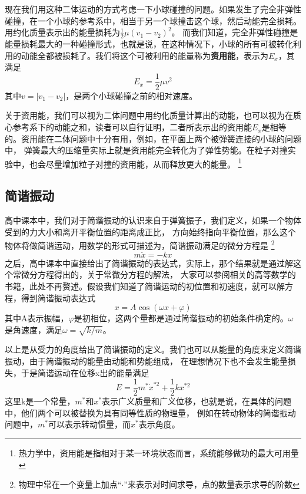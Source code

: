 \documentclass{article}
\begin{document}
    现在我们用这种二体运动的方式考虑一下小球碰撞的问题。如果发生了完全非弹性碰撞，在一个小球的参考系中，相当于另一个球撞击这个球，然后动能完全损耗。用约化质量表示出的能量损耗为\(\frac{1}{2}\mu (v_1 - v_2)^2\)。
    而我们知道，完全非弹性碰撞是能量损耗最大的一种碰撞形式，也就是说，在这种情况下，小球的所有可被转化利用的动能全都被损耗了。我们将这个可被利用的能量称为\textbf{资用能}，表示为\(E_x\)，其满足
    \begin{equation*}
        E_x = \frac{1}{2}\mu v^2
    \end{equation*}
    其中\(v = |v_1 - v_2|\)，是两个小球碰撞之前的相对速度。

    关于资用能，我们可以视为二体问题中用约化质量计算出的动能，也可以视为在质心参考系下的动能之和，读者可以自行证明，二者所表示出的资用能\(E_x\)是相等的。资用能在二体问题中十分有用，例如，在平面上两个被弹簧连接的小球的问题中，
    弹簧最大的压缩量实际上就是资用能完全转化为了弹性势能。在粒子对撞实验中，也会尽量增加粒子对撞的资用能，从而释放更大的能量。
    \footnote{热力学中，资用能是指相对于某一环境状态而言，系统能够做功的最大可用量}


    \subsection{简谐振动}
    高中课本中，我们对于简谐振动的认识来自于弹簧振子，我们定义，如果一个物体受到的力大小和离开平衡位置的距离成正比，
    方向始终指向平衡位置，那么这个物体将做简谐运动，用数学的形式可描述为，简谐振动满足的微分方程是
    \footnote{物理中常在一个变量上加点“\(\cdot\)”来表示对时间求导，点的数量表示求导的阶数}
    \begin{equation*}
        m\ddot{x} = -kx
    \end{equation*}
    之后，高中课本中直接给出了简谐振动的表达式，实际上，那个结果就是通过解这个常微分方程得出的，关于常微分方程的解法，
    大家可以参阅相关的高等数学的书籍，此处不再赘述。假设我们知道了简谐运动的初位置和初速度，就可以解方程，得到简谐振动表达式
    \begin{equation*}
        x = A\cos(\omega x + \varphi)
    \end{equation*}
    其中A表示振幅，\(\varphi\)是初相位，这两个量都是通过简谐振动的初始条件确定的。\(\omega\)是角速度，满足\(\omega = \sqrt{k/m}\)。

    以上是从受力的角度给出了简谐振动的定义。我们也可以从能量的角度来定义简谐振动，由于简谐振动的能量由动能和势能组成，
    在理想情况下也不会发生能量损失，于是简谐运动在位移x出的能量满足
    \begin{equation*}
        E = \frac{1}{2}m^* \dot{x}^{*2} + \frac{1}{2}kx^{*2}
    \end{equation*}
    这里k是一个常量，\(m^*\)和\(x^*\)表示广义质量和广义位移，也就是说，在具体的问题中，他们两个可以被替换为具有同等性质的物理量，
    例如在转动物体的简谐振动问题中，\(m^*\)可以表示转动惯量，而\(x^*\)表示角度。
\end{document}
